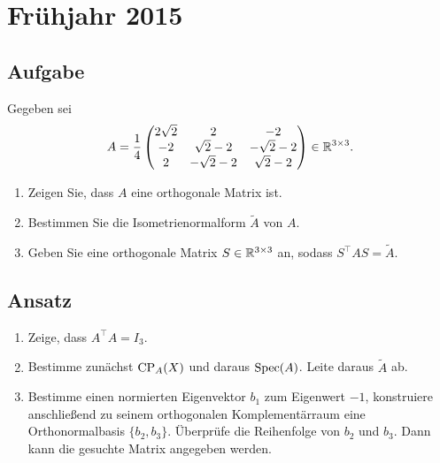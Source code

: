 \newpage

\section{Frühjahr 2015}

\subsection{Aufgabe}
Gegeben sei
\begin{equation*}
	A = \frac{1}{4}\begin{pmatrix}
		2\sqrt{2} & 2 & -2 \\
		-2 & \sqrt{2}-2 & -\sqrt{2}-2 \\
		2 & -\sqrt{2}-2 & \sqrt{2}-2
	\end{pmatrix} \in \mathbb{R}^{3 \times 3}\text{.}
\end{equation*}
\begin{enumerate}
	\item Zeigen Sie, dass \( A \) eine orthogonale Matrix ist.
	\item Bestimmen Sie die Isometrienormalform \( \widetilde{A} \) von \( A \).
	\item Geben Sie eine orthogonale Matrix \( S \in \mathbb{R}^{3 \times 3} \) an, sodass \( S^\top AS = \widetilde{A} \). 
\end{enumerate}

\subsection{Ansatz}
\begin{enumerate}
	\item Zeige, dass \( A^\top A = I_3 \).
	\item Bestimme zunächst \( \text{CP}_A(X) \) und daraus \( \text{Spec}(A) \). Leite daraus \( \widetilde{A} \) ab.
	\item Bestimme einen normierten Eigenvektor \( b_1 \) zum Eigenwert \( -1 \), konstruiere anschließend zu seinem orthogonalen Komplementärraum eine Orthonormalbasis \( \{ b_2,b_3 \} \). Überprüfe die Reihenfolge von \( b_2 \) und \( b_3 \). Dann kann die gesuchte Matrix angegeben werden.
\end{enumerate}

